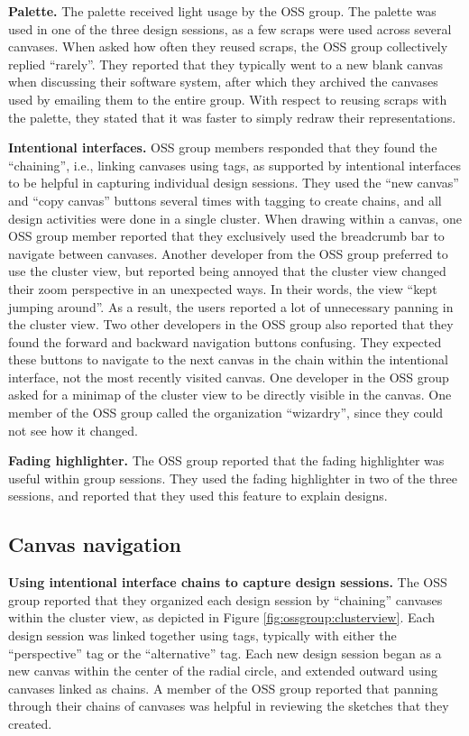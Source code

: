 \documentclass[12pt,fleqn]{ucithesis}
\begin{document}
\textbf{Palette.} The palette received light usage by the OSS group. The palette was used in one of the three design sessions, as a few scraps were used across several canvases. When asked how often they reused scraps, the OSS group collectively replied ``rarely''. They reported that they typically went to a new blank canvas when discussing their software system, after which they archived the canvases used by emailing them to the entire group. With respect to reusing scraps with the palette, they stated that it was faster to simply redraw their representations.

\textbf{Intentional interfaces.} OSS group members responded that they found the ``chaining'', i.e., linking canvases using tags, as supported by intentional interfaces to be helpful in capturing individual design sessions. They used the ``new canvas'' and ``copy canvas'' buttons several times with tagging to create chains, and all design activities were done in a single cluster. When drawing within a canvas, one OSS group member reported that they exclusively used the breadcrumb bar to navigate between canvases. Another developer from the OSS group preferred to use the cluster view, but reported being annoyed that the cluster view changed their zoom perspective in an unexpected ways. In their words, the view ``kept jumping around''. As a result, the users reported a lot of unnecessary panning in the cluster view. Two other developers in the OSS group also reported that they found the forward and backward navigation buttons confusing. They expected these buttons to navigate to the next canvas in the chain within the intentional interface, not the most recently visited canvas. One developer in the OSS group asked for a minimap of the cluster view to be directly visible in the canvas. One member of the OSS group called the organization ``wizardry'', since they could not see how it changed.

\textbf{Fading highlighter.} The OSS group reported that the fading highlighter was useful within group sessions. They used the fading highlighter in two of the three sessions, and reported that they used this feature to explain designs.

\subsection{Canvas navigation}

\textbf{Using intentional interface chains to capture design sessions.} The OSS group reported that they organized each design session by ``chaining'' canvases within the cluster view, as depicted in Figure \ref{fig:ossgroup:clusterview}. Each design session was linked together using tags, typically with either the ``perspective'' tag or the ``alternative'' tag. Each new design session began as a new canvas within the center of the radial circle, and extended outward using canvases linked as chains. A member of the OSS group reported that panning through their chains of canvases was helpful in reviewing the sketches that they created.
\end{document}
